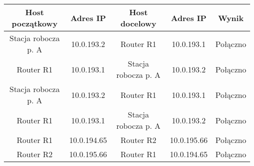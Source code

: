 \documentclass[wide,a4paper,titlepage,12pt] {article}
\begin{document}
  \begin{center}
    \begin{tabular}{|c|c||c|c||c|}
      \hline
      Host początkowy & Adres IP & Host docelowy & Adres IP & Wynik \\
      \hline
      Stacja robocza p. A & 10.0.193.2 & Router R1 & 10.0.193.1 & Połączno \\
      Router R1 & 10.0.193.1 & Stacja robocza p. A & 10.0.193.2 & Połączno \\
      Stacja robocza p. A & 10.0.193.2 & Router R1 & 10.0.193.1 & Połączno \\
      Router R1 & 10.0.193.1 & Stacja robocza p. A & 10.0.193.2 & Połączno \\

      Router R1 & 10.0.194.65 & Router R2 & 10.0.195.66 & Połączno \\
      Router R2 & 10.0.195.66 & Router R1 & 10.0.194.65 & Połączno \\
      \hline
    \end{tabular}
  \end{center}
\end{document}

